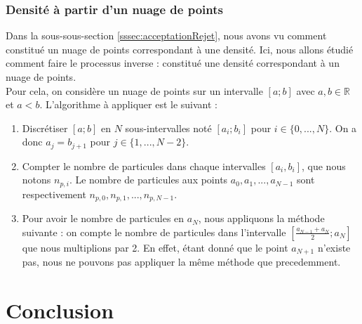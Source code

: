 \documentclass{article}
\begin{document}
\subsubsection{Densité à partir d'un nuage de points}
Dans la sous-sous-section \ref{sssec:acceptationRejet}, nous avons vu comment constitué un nuage de points correspondant à une densité. Ici, nous allons étudié comment faire le processus inverse : constitué une densité correspondant à un nuage de points.\\
Pour cela, on considère un nuage de points sur un intervalle $[a;b]$ avec $a,b \in \mathbb{R}$ et $a < b$. L'algorithme à appliquer est le suivant :
\begin{enumerate}
\item Discrétiser $[a;b]$ en $N$ sous-intervalles noté $[a_i; b_i]$ pour $i \in \{0,...,N\}$. On a donc $a_j = b_{j+1}$ pour $j \in \{1,...,N-2\}$.
\item Compter le nombre de particules dans chaque intervalles $[a_i, b_i]$, que nous notons $n_{p,i}$. Le nombre de particules aux points $a_0, a_1, ...,a_{N-1}$ sont respectivement $n_{p,0}, n_{p,1}, ..., n_{p,N-1}$.
\item Pour avoir le nombre de particules en $a_N$, nous appliquons la méthode suivante : on compte le nombre de particules dans l'intervalle $[\frac {a_{N-1} + a_N} {2}; a_N]$ que nous multiplions par 2. En effet, étant donné que le point $a_{N+1}$ n'existe pas, nous ne pouvons pas appliquer la même méthode que precedemment.
\end{enumerate}
\section{Conclusion}
\end{document}
